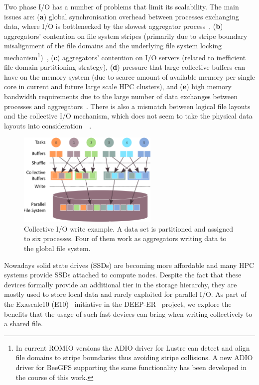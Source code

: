 Two phase I/O has a number of problems that limit its scalability. The main issues are: (\textbf{a}) global synchronisation overhead between processes exchanging data, where I/O is bottlenecked by the slowest aggregator process~\cite{WeikuanV08}, 
(\textbf{b}) aggregators' contention on file system stripes (primarily due to stripe boundary misalignment of the file domains and the underlying file system locking mechanism\footnote{In current ROMIO versions the ADIO driver for Lustre can 
detect and align file domains to stripe boundaries thus avoiding stripe collisions. A new ADIO driver for BeeGFS supporting the same functionality has been developed in the course of this work.})~\cite{LiaoA08}, (\textbf{c}) aggregators' 
contention on I/O servers (related to inefficient file domain partitioning strategy), (\textbf{d}) pressure that large collective buffers can have on the memory system (due to scarce amount of available memory per single core in current and 
future large scale HPC clusters), and (\textbf{e}) high memory bandwidth requirements due to the large number of data exchanges between processes and aggregators~\cite{YinYTY12}. There is also a mismatch between logical file layouts and the 
collective I/O mechanism, which does not seem to take the physical data layouts into consideration~\cite{YongXTRG11}~\cite{XuechenJD09}.

\begin{figure}[!htb]
  \centering
  \includegraphics[width=0.6\textwidth]{chapters/chapter3/figures/coll-io}
  \caption{Collective I/O write example. A data set is partitioned and assigned to six processes. Four of them work as aggregators writing data to the global file system.}
  \label{figure: coll_io}
\end{figure}

Nowadays solid state drives (SSDs) are becoming more affordable and many HPC systems provide SSDs attached to compute nodes. Despite the fact that these devices formally provide an additional tier in the storage hierarchy, they are mostly used to 
store local data and rarely exploited for parallel I/O. As part of the Exascale10 (E10)~\cite{e10} initiative in the DEEP-ER~\cite{deep-er} project, we explore the benefits that the usage of such fast devices can bring when writing collectively to a 
shared file.

